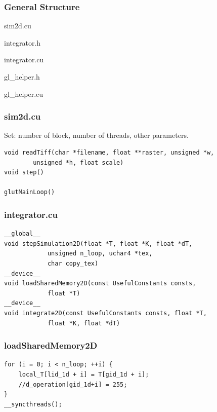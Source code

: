 \begin{frame}
\frametitle{General Structure}
\begin{center}
	sim2d.cu

	\vspace{5mm}
	integrator.h
	
	integrator.cu
	\vspace{5mm}
	
	gl\_helper.h
	
	gl\_helper.cu
\end{center}
\end{frame}

\begin{frame}[fragile]
\frametitle{sim2d.cu}
Set: number of block, number of threads, other parameters.
\vspace{10mm}
\begin{lstlisting}
void readTiff(char *filename, float **raster, unsigned *w, 
		unsigned *h, float scale)
void step()

glutMainLoop()
\end{lstlisting}
\end{frame}

\begin{frame}[fragile]
\frametitle{integrator.cu}
\begin{lstlisting}
__global__ 
void stepSimulation2D(float *T, float *K, float *dT, 
			unsigned n_loop, uchar4 *tex, 
			char copy_tex)
__device__ 
void loadSharedMemory2D(const UsefulConstants consts, 
			float *T)
__device__ 
void integrate2D(const UsefulConstants consts, float *T, 
			float *K, float *dT)
\end{lstlisting}
\end{frame}

\begin{frame}[fragile]
\frametitle{loadSharedMemory2D}
\begin{lstlisting}
for (i = 0; i < n_loop; ++i) {
	local_T[lid_1d + i] = T[gid_1d + i];
	//d_operation[gid_1d+i] = 255;
}
__syncthreads();
\end{lstlisting}
\end{frame}

